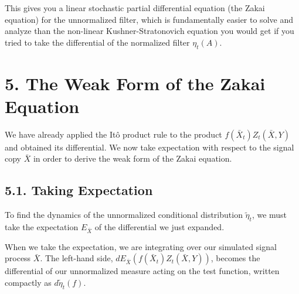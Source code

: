 \documentclass[11pt]{article}
\theoremstyle{definition}
\theoremstyle{remark}
\begin{document}
This gives you a linear stochastic partial differential equation (the Zakai equation) for the unnormalized filter, which is fundamentally easier to solve and analyze than the non-linear Kushner-Stratonovich equation you would get if you tried to take the differential of the normalized filter $\eta_t(A)$.

\section*{5. The Weak Form of the Zakai Equation}
We have already applied the It\^o product rule to the product $f(\bar X_t)Z_t(\bar X,Y)$ and obtained its differential. We now take expectation with respect to the signal copy $\bar X$ in order to derive the weak form of the Zakai equation.

\subsection*{5.1. Taking Expectation}
To find the dynamics of the unnormalized conditional distribution $\tilde \eta_t$, we must take the expectation $E_{\bar X}$ of the differential we just expanded.

When we take the expectation, we are integrating over our simulated signal process $\bar X$. The left-hand side, $dE_{\bar X}(f(\bar X_t)Z_t(\bar X,Y))$, becomes the differential of our unnormalized measure acting on the test function, written compactly as $d\tilde \eta_t(f)$.
\end{document}

